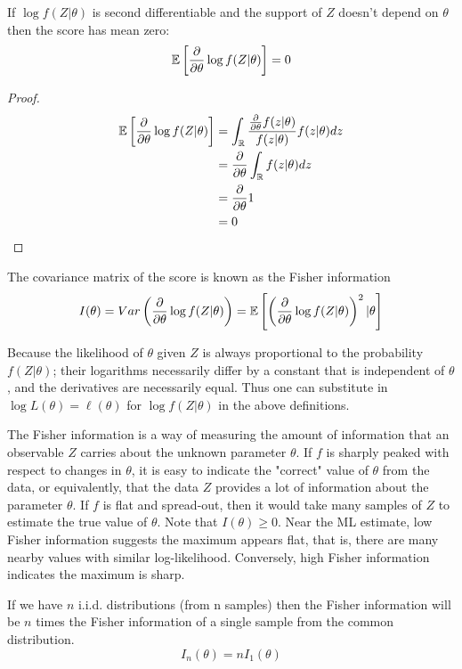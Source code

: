 \documentclass[DIV=14,titlepage=false]{scrreprt}
\begin{document}
\begin{theorem}
    If $\log f(Z|\theta)$ is second differentiable and the support of $Z$ doesn't depend on $\theta$ then the score has mean zero:
    \[\mathbb{E} \left[\frac{\partial}{\partial \theta} \log f(Z|\theta)\right]=0\]
\end{theorem}
\begin{proof}
    \begin{align*}
        \mathbb{E} \left[\frac{\partial}{\partial \theta} \log f(Z|\theta)\right] &= \int_{\mathbb{R}} \frac{\frac{\partial}{\partial \theta}f(z|\theta)}{f(z|\theta)}f(z|\theta)dz\\
        &= \frac{\partial}{\partial \theta}\int_{\mathbb{R}}f(z|\theta)dz\\
        &= \frac{\partial}{\partial \theta} 1\\
        &=0
    \end{align*}
\end{proof}
\begin{definition}
    The covariance matrix of the score  is known as the Fisher information\[ I(\theta)=Var\left(\frac{\partial}{\partial \theta}\log f(Z|\theta)\right)=\mathbb{E}\left[\left(\frac{\partial}{\partial \theta}\log f(Z|\theta)\right)^2|\theta\right]\]
\end{definition}
\begin{note}
Because the likelihood of $\theta$ given $Z$ is always proportional to the probability $f(Z|\theta)$; their logarithms necessarily differ by a constant that is independent of $\theta$, and the derivatives are necessarily equal. Thus one can substitute in $\log L(\theta) = \ell (\theta)$ for $\log f(Z|\theta)$ in the above definitions.
\end{note}

The Fisher information is a way of measuring the amount of information that an observable $Z$ carries about the unknown parameter $\theta$. If $f$ is sharply peaked with respect to changes in $\theta$, it is easy to indicate the "correct" value of $\theta$ from the data, or equivalently, that the data $Z$ provides a lot of information about the parameter $\theta$. If $f$ is flat and spread-out, then it would take many samples of $Z$ to estimate the true value of $\theta$.
Note that $I(\theta)\geq0$. Near the ML estimate, low Fisher information suggests the maximum appears flat, that is, there are many nearby values with similar log-likelihood. Conversely, high Fisher information indicates the maximum is sharp.
\begin{claim}
If we have $n$ i.i.d. distributions (from n samples) then the Fisher information will be $n$ times the Fisher information of a single sample from the common distribution.
    \[I_n(\theta) = nI_1(\theta)\]
\end{claim}
\end{document}
